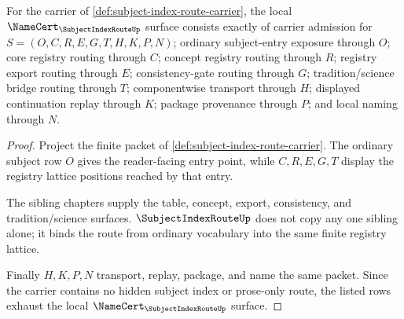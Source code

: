 \begin{theorem}
\label{thm:subject-index-route-namecert-obligations}
For the carrier of \autoref{def:subject-index-route-carrier}, the local $\NameCert_{\SubjectIndexRouteUp}$ surface consists exactly of carrier admission for $S=(O,C,R,E,G,T,H,K,P,N)$; ordinary subject-entry exposure through $O$; core registry routing through $C$; concept registry routing through $R$; registry export routing through $E$; consistency-gate routing through $G$; tradition/science bridge routing through $T$; componentwise transport through $H$; displayed continuation replay through $K$; package provenance through $P$; and local naming through $N$.
\end{theorem}
\begin{proof}
Project the finite packet of \autoref{def:subject-index-route-carrier}. The ordinary subject row $O$ gives the reader-facing entry point, while $C,R,E,G,T$ display the registry lattice positions reached by that entry.

The sibling chapters supply the table, concept, export, consistency, and tradition/science surfaces. $\SubjectIndexRouteUp$ does not copy any one sibling alone; it binds the route from ordinary vocabulary into the same finite registry lattice.

Finally $H,K,P,N$ transport, replay, package, and name the same packet. Since the carrier contains no hidden subject index or prose-only route, the listed rows exhaust the local $\NameCert_{\SubjectIndexRouteUp}$ surface.
\end{proof}

